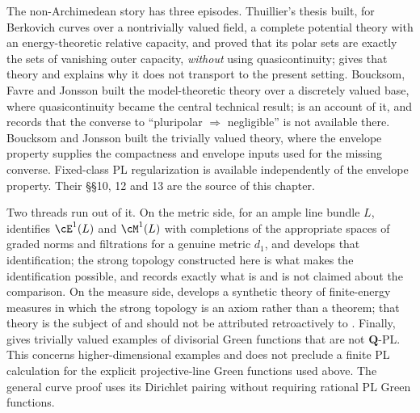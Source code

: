 The non-Archimedean story has three episodes.  Thuillier's thesis
\cite{Thu05} built, for Berkovich curves over a nontrivially valued field,
a complete potential theory with an energy-theoretic relative capacity, and
proved that its polar sets are exactly the sets of vanishing outer
capacity, \emph{without} using quasicontinuity; 
gives that theory and  explains why it does not
transport to the present setting.  Boucksom, Favre and Jonsson
\cite{BFJ15,BFJ16} built the model-theoretic theory over a discretely
valued base, where quasicontinuity became the central technical result;
 is an account of it, and
 records that the converse to ``pluripolar
$\Rightarrow$ negligible'' is not available there.  Boucksom and Jonsson
\cite{BJ22} built the trivially valued theory, where the envelope property
supplies the compactness and envelope inputs used for the missing
converse. Fixed-class PL regularization is available independently of
the envelope property. Their
\S\S10, 12 and 13 are the source of this chapter.

Two threads run out of it.  On the metric side,
for an ample line bundle $L$, \cite{BJKS1} identifies
$\cE^1(L)$ and $\cM^1(L)$ with completions of the appropriate
spaces of graded norms and filtrations for a genuine metric $d_1$, and
 develops that identification; the strong topology
constructed here is what makes the identification possible, and
 records exactly what is and is not claimed
about the comparison.  On the measure side, \cite{BJ25FiniteEnergy}
develops a synthetic theory of finite-energy measures in which the strong
topology is an axiom rather than a theorem; that theory is the subject of
 and should not be attributed
retroactively to \cite{BJ22}.  Finally, \cite[Theorem~60 and Examples~63, 65]{BJGreen24} gives
trivially valued examples of divisorial Green functions that are not
$\mathbf Q$-PL. This concerns higher-dimensional examples and does
not preclude a finite PL calculation for the explicit projective-line
Green functions used above. The general curve proof uses its
Dirichlet pairing without requiring rational PL Green functions.
